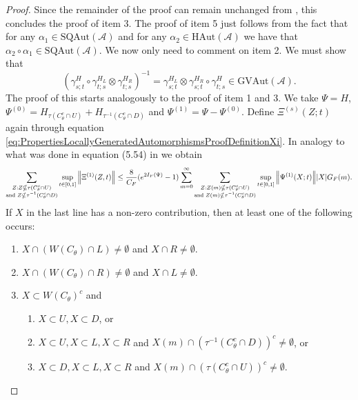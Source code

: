 \documentclass[12pt,a4paper,twoside]{article}
\renewcommand{\AA}{\mathcal A}
\theoremstyle{definition}
\numberwithin{equation}{section}
\begin{document}
\begin{proof}
	Since the remainder of the proof can remain unchanged from \cite{ogata2021h3gmathbb}, this concludes the proof of item 3. The proof of item 5 just follows from the fact that for any $\alpha_1\in\textrm{SQAut}(\AA)$ and for any $\alpha_2\in\textrm{HAut}(\AA)$ we have that $\alpha_2\circ\alpha_1\in\textrm{SQAut}(\AA)$. We now only need to comment on item 2. We must show that
	\begin{equation}
		(\gamma^H_{s;t}\circ\gamma^{H_L}_{t;s}\otimes\gamma^{H_R}_{t;s})^{-1}=\gamma^{H_L}_{s;t}\otimes\gamma^{H_R}_{s;t}\circ\gamma^H_{t;s}\in\textrm{GVAut}(\AA).
	\end{equation}
	The proof of this starts analogously to the proof of item 1 and 3. We take $\Psi=H$, $\Psi^{(0)}=H_{\tau(C_\theta^c\cap U)}+H_{\tau^{-1}(C_\theta^c\cap D)}$ and $\Psi^{(1)}=\Psi-\Psi^{(0)}$. Define $\Xi^{(s)}(Z;t)$ again through equation \eqref{eq:PropertiesLocallyGeneratedAutomorphismsProofDefinitionXi}. In analogy to what was done in equation (5.54) in \cite{ogata2021h3gmathbb} we obtain
	\begin{equation}
		\sum_{\substack{Z:Z\nsubseteq \tau(C_\theta^c\cap U)\\\text{and }Z\nsubseteq \tau^{-1}(C_\theta^c\cap D)}}\sup_{t\in[0,1]}\norm{\Xi^{(1)}(Z,t)}\leq \frac{8}{C_F}(e^{2I_F(\Psi)}-1)\sum_{m=0}^\infty\sum_{\substack{Z:Z(m)\nsubseteq \tau(C_\theta^c\cap U)\\\text{and }Z(m)\nsubseteq \tau^{-1}(C_\theta^c\cap D)}} \sup_{t\in[0,1]}\norm{\Psi^{(1)}(X;t)}\abs{X}G_F(m).
	\end{equation}
	If $X$ in the last line has a non-zero contribution, then at least one of the following occurs:
	\begin{enumerate}
		\item $X\cap (W(C_\theta)\cap L)\neq\emptyset$ and $X\cap R\neq\emptyset$.
		\item $X\cap (W(C_\theta)\cap R)\neq\emptyset$ and $X\cap L\neq\emptyset$.
		\item $X\subset W(C_\theta)^c$ and
		\begin{enumerate}
			\item $X\subset U,X\subset D$, or
			\item $X\subset U,X\subset L,X\subset R$ and $X(m)\cap (\tau^{-1}(C_\theta^c\cap D))^c\neq \emptyset$, or
			\item $X\subset D,X\subset L,X\subset R$ and $X(m)\cap (\tau(C_\theta^c\cap U))^c\neq \emptyset$.
		\end{enumerate}
	\end{enumerate}

\end{proof}
\end{document}
